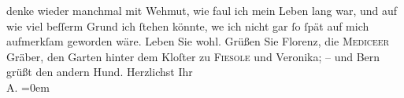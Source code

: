 \begin{ledgroupsized}[t]{13cm}
               denke wieder manchmal mit Wehmut, wie faul ich mein Leben lang war, und auf wie viel
               beſſerm Grund ich {\pb}ſtehen könnte, we{\geminationn} ich nicht gar ſo ſpät auf mich aufmerkſam geworden
               wäre. \pend
           \pstart
           Leben Sie wohl. Grüßen Sie Florenz, die \textsc{Mediceer} Gräber, den Garten hinter dem Kloſter zu \textsc{Fiesole} und Veronika; – und Bern grüßt den andern
               Hund. \pend
           \pstart
           Herzlichst Ihr {\\[\baselineskip]}\spacefill\mbox{A.}\pend
           \leftskip=0em{}
         
         \endnumbering{}\end{ledgroupsized}\begin{anhang}\end{anhang}\newcommand{\dateiname}{L02974}\newcommand{\titel}{Arthur Schnitzler an Felix Salten, 27. 5. 1902}\newcommand{\editorInnen}{Martin Anton Müller und Laura Untner}
      